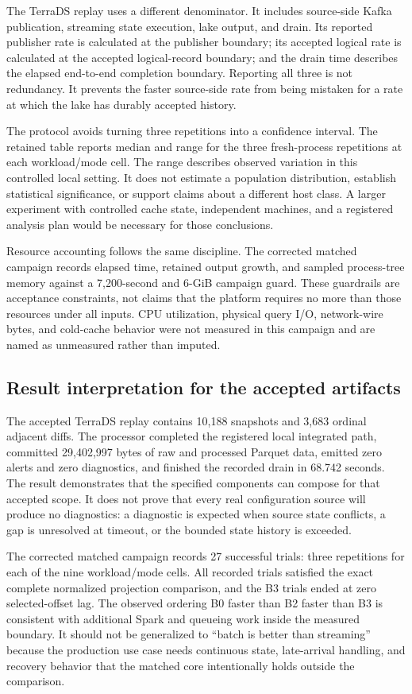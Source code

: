 \documentclass[a4paper,11pt]{article}
\begin{document}
The TerraDS replay uses a different denominator. It includes source-side Kafka publication, streaming state execution, lake output, and drain. Its reported publisher rate is calculated at the publisher boundary; its accepted logical rate is calculated at the accepted logical-record boundary; and the drain time describes the elapsed end-to-end completion boundary. Reporting all three is not redundancy. It prevents the faster source-side rate from being mistaken for a rate at which the lake has durably accepted history.

The protocol avoids turning three repetitions into a confidence interval. The retained table reports median and range for the three fresh-process repetitions at each workload/mode cell. The range describes observed variation in this controlled local setting. It does not estimate a population distribution, establish statistical significance, or support claims about a different host class. A larger experiment with controlled cache state, independent machines, and a registered analysis plan would be necessary for those conclusions.

Resource accounting follows the same discipline. The corrected matched campaign records elapsed time, retained output growth, and sampled process-tree memory against a 7,200-second and 6-GiB campaign guard. These guardrails are acceptance constraints, not claims that the platform requires no more than those resources under all inputs. CPU utilization, physical query I/O, network-wire bytes, and cold-cache behavior were not measured in this campaign and are named as unmeasured rather than imputed.

\subsection{Result interpretation for the accepted artifacts}

The accepted TerraDS replay contains 10,188 snapshots and 3,683 ordinal adjacent diffs. The processor completed the registered local integrated path, committed 29,402,997 bytes of raw and processed Parquet data, emitted zero alerts and zero diagnostics, and finished the recorded drain in 68.742 seconds. The result demonstrates that the specified components can compose for that accepted scope. It does not prove that every real configuration source will produce no diagnostics: a diagnostic is expected when source state conflicts, a gap is unresolved at timeout, or the bounded state history is exceeded.

The corrected matched campaign records 27 successful trials: three repetitions for each of the nine workload/mode cells. All recorded trials satisfied the exact complete normalized projection comparison, and the B3 trials ended at zero selected-offset lag. The observed ordering B0 faster than B2 faster than B3 is consistent with additional Spark and queueing work inside the measured boundary. It should not be generalized to ``batch is better than streaming'' because the production use case needs continuous state, late-arrival handling, and recovery behavior that the matched core intentionally holds outside the comparison.
\end{document}
